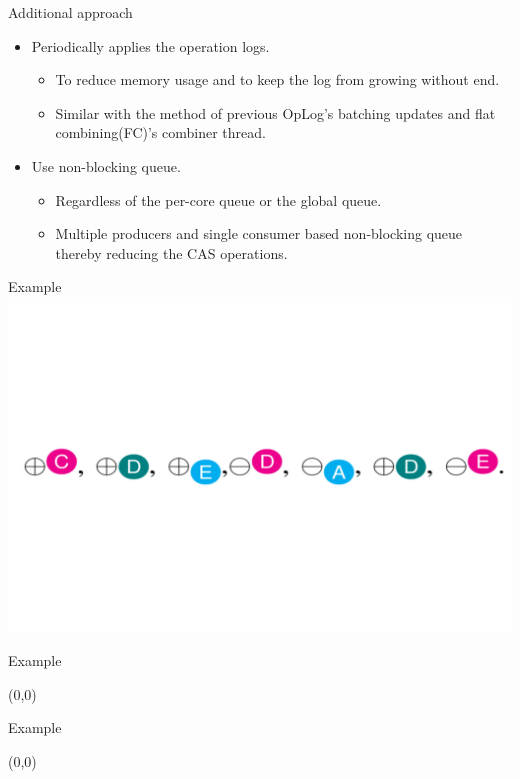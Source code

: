 \documentclass[english]{beamer} %
\begin{document}
\begin{frame}{Additional approach}
	\begin{itemize}
	\item Periodically applies the operation logs.
	\begin{itemize}
	\item To reduce memory usage and to keep the log from growing without
	end.
	\item Similar with the method of previous OpLog’s batching
	updates and flat combining(FC)’s combiner thread.
	\end{itemize}
	\item Use non-blocking queue.
	\begin{itemize}
	  \item Regardless of the per-core queue or the global
	  queue.
	  \item Multiple producers and single consumer based non-blocking queue
	  thereby reducing the CAS operations.
	\end{itemize}
	\end{itemize}
\end{frame}


\begin{frame}{Example}
\includegraphics[scale=0.5]{fig/example}
\end{frame}


\begin{frame}{Example}
\begin{textblock}{1}(0,0)
\end{textblock}
\end{frame}

\begin{frame}{Example}
\begin{textblock}{1}(0,0)
\end{textblock}
\end{frame}
\end{document}
